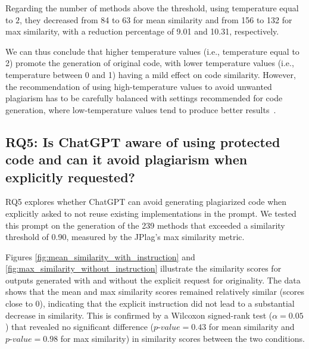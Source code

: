Regarding the number of methods above the threshold, using temperature equal to $2$, they decreased from 84 to 63 for mean similarity and from 156 to 132 for max similarity, with a reduction percentage of 9.01 and 10.31, respectively. 


We can thus conclude that higher temperature values (i.e., temperature equal to 2) promote the generation of original code, with lower temperature values (i.e., temperature between 0 and 1) having a mild effect on code similarity. However, the recommendation of using high-temperature values to avoid unwanted plagiarism has to be carefully balanced with settings recommended for code generation, where low-temperature values tend to produce better results~\cite{arora2024optimizing,ouyang2023empirical,liu2024your}.  

\noindent {}

\subsection{RQ5: Is ChatGPT aware of using protected code and can it avoid plagiarism when explicitly requested?}

RQ5 explores whether ChatGPT can avoid generating plagiarized code when explicitly asked to not reuse existing implementations in the prompt. We tested this prompt on the generation of the 239 methods that \textcolor{review}{exceeded a similarity threshold of 0.90, measured by the JPlag's max similarity metric.}

Figures \ref{fig:mean_similarity_with_instruction} and \ref{fig:max_similarity_without_instruction} illustrate the similarity scores for outputs generated with and without the explicit request for originality. The data shows that the mean and max similarity scores remained relatively similar (scores close to 0), indicating that the explicit instruction did not lead to a substantial decrease in similarity. This is confirmed by a Wilcoxon signed-rank test ($\alpha=0.05$) that revealed no significant difference ($\textit{p-value} = 0.43$ for mean similarity and $\textit{p-value} = 0.98$ for max similarity) in similarity scores between the two conditions. 

